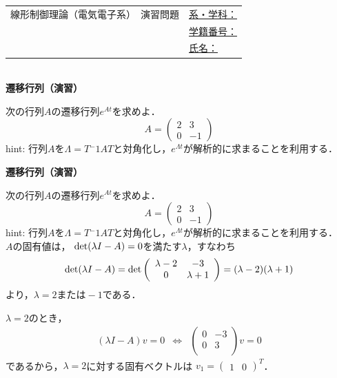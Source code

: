 \documentclass[a4paper,11pt]{jreport}
\def\det{\mathop{\rm det}\nolimits}
\begin{document}
\newpage

\begin{tabular}{cl}
\hspace*{2cm}
{\large 線形制御理論（電気電子系）　演習問題}
\hspace{1cm}
&
\underline{系・学科：\hspace{3cm}}
\\[2mm]
&\underline{学籍番号：\hspace{3cm}}
\\[2mm]
&\underline{氏名：\hspace{5cm}}
\end{tabular}
\ \\

\noindent
{\bf 遷移行列（演習）} \nopagebreak

次の行列$A$の遷移行列$e^{At}$を求めよ．
\[
	A= \left(\begin{array}{cc}
		2 & 3 \\
		0 & -1
	   \end{array} \right )
\]
hint: 行列$A$を$\Lambda = T{^-1}AT$と対角化し，$e^{\Lambda t}$が解析的に求まることを利用する．


\newpage


\noindent
{\bf 遷移行列（演習）} \nopagebreak

次の行列$A$の遷移行列$e^{At}$を求めよ．
\[
	A= \left(\begin{array}{cc}
		2 & 3 \\
		0 & -1
	   \end{array} \right )
\]
hint: 行列$A$を$\Lambda = T{^-1}AT$と対角化し，$e^{\Lambda t}$が解析的に求まることを利用する．\\

$A$の固有値は，
$\det(\lambda I - A) = 0$を満たす$\lambda$，すなわち
\[
 \det(\lambda I - A) = 
 \det
 \left(
 \begin{array}{cc}
  \lambda - 2 & -3 \\
  0           & \lambda +1 \\
 \end{array}
 \right) =
 (\lambda - 2)(\lambda +1) 
\]
より，$\lambda = 2 または -1$である．

$\lambda = 2$のとき，
\[
 \begin{array}{ccc}
 (\lambda I - A) v = 0 
 &\Leftrightarrow&
 \left(
 \begin{array}{cc}
  0 & -3 \\
  0 & 3 \\
 \end{array}
 \right) v = 0 
 \end{array}
\]
であるから，$\lambda = 2$に対する固有ベクトルは
$v_1 = (\begin{array}{cc}1 & 0\end{array})^T$．
\end{document}
